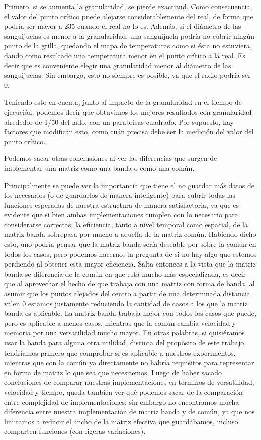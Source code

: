 \documentclass[a4paper]{article}
\begin{document}
Primero, si se aumenta la granularidad, se pierde exactitud. Como consecuencia, el valor del punto crítico puede alejarse considerablemente del real, de forma que podría ser mayor a 235 cuando el real no lo es. Además, si el diámetro de las sanguijuelas es menor a la granularidad, una sanguijuela podría no cubrir ningún punto de la grilla, quedando el mapa de temperaturas como si ésta no estuviera, dando como resultado una temperatura menor en el punto crítico a la real. Es decir que es conveniente elegir una granularidad menor al diámetro de las sanguijuelas. Sin embargo, esto no siempre es posible, ya que el radio podría ser 0.

Teniendo esto en cuenta, junto al impacto de la granularidad en el tiempo de ejecución, podemos decir que obtuvimos los mejores resultados con granularidad alrededor de 1/50 del lado, con un parabrisas cuadrado. Por supuesto, hay factores que modifican esto, como cuán precisa debe ser la medición del valor del punto crítico.

Podemos sacar otras conclusiones al ver las diferencias que surgen de implementar una matriz como una banda o como una común.

Principalmente se puede ver la importancia que tiene el no guardar más datos de los necesarios (o de guardarlos de manera inteligente) para cubrir todas las funciones esperadas de nuestra estructura de manera satisfactoria, ya que es evidente que si bien ambas implementaciones cumplen con lo necesario para considerarse correctas, la eficiencia, tanto a nivel temporal como espacial, de la matriz banda sobrepasa por mucho a aquella de la matriz común.
Habiendo dicho esto, uno podría pensar que la matriz banda sería deseable por sobre la común en todos los casos, pero podemos hacernos la pregunta de si no hay algo que estemos perdiendo al obtener esta mayor eficiencia.  Salta entonces a la vista que la matriz banda se diferencia de la común en que está mucho más especializada, es decir que al aprovechar el hecho de que trabaja con una matriz con forma de banda, al asumir que los puntos alejados del centro a partir de una determinada distancia valen 0 estamos justamente reduciendo la cantidad de casos a los que la matriz banda es aplicable. La matriz banda trabaja mejor con todos los casos que puede, pero es aplicable a menos casos, mientras que la común cambia velocidad y memoria por una versatilidad mucho mayor.
En otras palabras, si quisiéramos usar la banda para alguna otra utilidad, distinta del propósito de este trabajo, tendríamos primero que comprobar si es aplicable a nuestros experimentos, mientras que con la común ya directamente no habría requisitos para representar en forma de matriz lo que sea que necesitemos.
Luego de haber sacado conclusiones de comparar nuestras implementaciones en términos de versatilidad, velocidad y tiempo, queda también ver qué podemos sacar de la comparación entre complejidad de implementaciones; sin embargo no encontramos mucha diferencia entre nuestra implementación de matriz banda y de común, ya que nos limitamos a reducir el ancho de la matriz efectiva que guardábamos, incluso comparten funciones (con ligeras variaciones).
\end{document}
